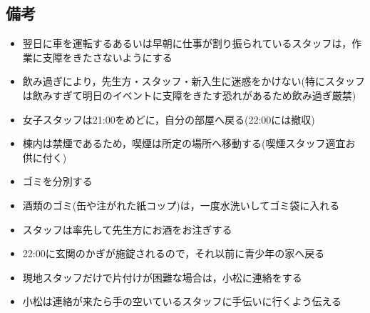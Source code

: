 \subsection{備考}
\begin{itemize}
	\item 翌日に車を運転するあるいは早朝に仕事が割り振られているスタッフは，作業に支障をきたさないようにする
	\item 飲み過ぎにより，先生方・スタッフ・新入生に迷惑をかけない(特にスタッフは飲みすぎて明日のイベントに支障をきたす恐れがあるため飲み過ぎ厳禁)
	\item 女子スタッフは21:00をめどに，自分の部屋へ戻る(22:00には撤収)
	\item 棟内は禁煙であるため，喫煙は所定の場所へ移動する(喫煙スタッフ適宜お供に付く)
	\item ゴミを分別する
	\item 酒類のゴミ(缶や注がれた紙コップ)は，一度水洗いしてゴミ袋に入れる
	\item スタッフは率先して先生方にお酒をお注ぎする
	\item 22:00に玄関のかぎが施錠されるので，それ以前に青少年の家へ戻る
	\item 現地スタッフだけで片付けが困難な場合は，小松に連絡をする
	\item 小松は連絡が来たら手の空いているスタッフに手伝いに行くよう伝える
\end{itemize}

%
